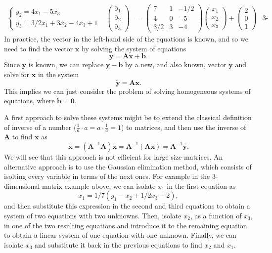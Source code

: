 \documentclass{article}
\begin{document}
\begin{align*}
\begin{cases}
		                  y_2 = 4x_1 - 5x_3              \\
		                  y_3 = 3/2x_1 + 3x_2 - 4x_3 + 1
	                  \end{cases} &
	\begin{pmatrix}
		y_1 \\
		y_2 \\
		y_3
	\end{pmatrix}
	                & =
	\begin{pmatrix}
		7   & 1 & -1/2 \\
		4   & 0 & -5   \\
		3/2 & 3 & -4
	\end{pmatrix}
	\begin{pmatrix}
		x_1 \\
		x_2 \\
		x_3
	\end{pmatrix}
	+
	\begin{pmatrix}
		2 \\
		0 \\
		1
	\end{pmatrix} & \text{3-dimensional matrix}
\end{align*}
In practice, the vector in the left-hand side of the equations is known, and so we need to find the vector $\bm{x}$ by solving the system of equations
\begin{equation*}
	\bm{y} = \bm{A} \bm{x} + \bm{b}.
\end{equation*}
Since $\bm{y}$ is known, we can replace $\bm{y}-\bm{b}$ by a new, and also known, vector $\bm{\tilde{y}}$ and solve for $\bm{x}$ in the system
\begin{equation*}
	\bm{\tilde{y}} = \bm{A} \bm{x}.
\end{equation*}
This implies we can just consider the problem of solving homogeneous systems of equations, where $\bm{b} = \bm{0}$.

A first approach to solve these systems might be to extend the classical definition of inverse of a number ($\frac{1}{a} \cdot a = a\cdot \frac{1}{a}  = 1$) to matrices, and then use the inverse of $\bm{A}$ to find $\bm{x}$ as
\begin{equation*}
	\bm{x} = (\bm{A}^{-1}  \bm{A}) \bm{x} = \bm{A}^{-1} ( \bm{A} \bm{x}) = \bm{A}^{-1} \bm{\tilde{y}}.
\end{equation*}
We will see that this approach is not efficient for large size matrices. An alternative approach is to use the Gaussian elimination method, which consists of isolting every variable in terms of the next ones. For example in the 3-dimensional matrix example above, we can isolate $x_1$ in the first equation as
\begin{equation*}
	x_1 = 1/7(y_1 - x_2 + 1/2 x_3 - 2),
\end{equation*}
and then substitute this expression in the second and third equations to obtain a system of two equations with two unknowns. Then, isolate $x_2$, as a function of $x_3$, in one of the two resulting equations and introduce it to the remaining equation to obtain a linear system of one equation with one unknown. Finally, we can isolate $x_3$ and substitute it back in the previous equations to find $x_2$ and $x_1$.
\end{document}
